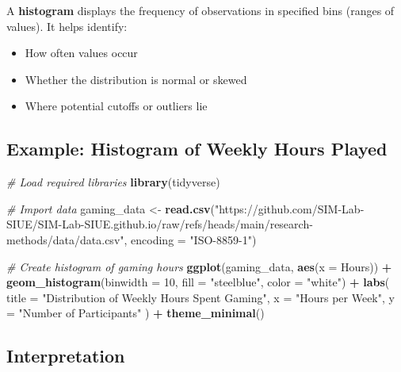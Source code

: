\documentclass[
]{book}
\newenvironment{Shaded}{\begin{snugshade}}{\end{snugshade}}
\newcommand{\AttributeTok}[1]{\textcolor[rgb]{0.13,0.29,0.53}{#1}}
\newcommand{\CommentTok}[1]{\textcolor[rgb]{0.56,0.35,0.01}{\textit{#1}}}
\newcommand{\DecValTok}[1]{\textcolor[rgb]{0.00,0.00,0.81}{#1}}
\newcommand{\FunctionTok}[1]{\textcolor[rgb]{0.13,0.29,0.53}{\textbf{#1}}}
\newcommand{\NormalTok}[1]{#1}
\newcommand{\OtherTok}[1]{\textcolor[rgb]{0.56,0.35,0.01}{#1}}
\newcommand{\SpecialCharTok}[1]{\textcolor[rgb]{0.81,0.36,0.00}{\textbf{#1}}}
\newcommand{\StringTok}[1]{\textcolor[rgb]{0.31,0.60,0.02}{#1}}
\providecommand{\tightlist}{%
  \setlength{\itemsep}{0pt}\setlength{\parskip}{0pt}}
\begin{document}
A \textbf{histogram} displays the frequency of observations in specified bins (ranges of values). It helps identify:

\begin{itemize}
\tightlist
\item
  How often values occur
\item
  Whether the distribution is normal or skewed
\item
  Where potential cutoffs or outliers lie
\end{itemize}

\subsection{Example: Histogram of Weekly Hours Played}\label{example-histogram-of-weekly-hours-played}

\begin{Shaded}
\begin{Highlighting}[]
\CommentTok{\# Load required libraries}
\FunctionTok{library}\NormalTok{(tidyverse)}

\CommentTok{\# Import data}
\NormalTok{gaming\_data }\OtherTok{\textless{}{-}} \FunctionTok{read.csv}\NormalTok{(}\StringTok{"https://github.com/SIM{-}Lab{-}SIUE/SIM{-}Lab{-}SIUE.github.io/raw/refs/heads/main/research{-}methods/data/data.csv"}\NormalTok{, }\AttributeTok{encoding =} \StringTok{"ISO{-}8859{-}1"}\NormalTok{)}

\CommentTok{\# Create histogram of gaming hours}
\FunctionTok{ggplot}\NormalTok{(gaming\_data, }\FunctionTok{aes}\NormalTok{(}\AttributeTok{x =}\NormalTok{ Hours)) }\SpecialCharTok{+}
  \FunctionTok{geom\_histogram}\NormalTok{(}\AttributeTok{binwidth =} \DecValTok{10}\NormalTok{, }\AttributeTok{fill =} \StringTok{"steelblue"}\NormalTok{, }\AttributeTok{color =} \StringTok{"white"}\NormalTok{) }\SpecialCharTok{+}
  \FunctionTok{labs}\NormalTok{(}
    \AttributeTok{title =} \StringTok{"Distribution of Weekly Hours Spent Gaming"}\NormalTok{,}
    \AttributeTok{x =} \StringTok{"Hours per Week"}\NormalTok{,}
    \AttributeTok{y =} \StringTok{"Number of Participants"}
\NormalTok{  ) }\SpecialCharTok{+}
  \FunctionTok{theme\_minimal}\NormalTok{()}
\end{Highlighting}
\end{Shaded}

\subsection{Interpretation}\label{interpretation-7}
\end{document}
